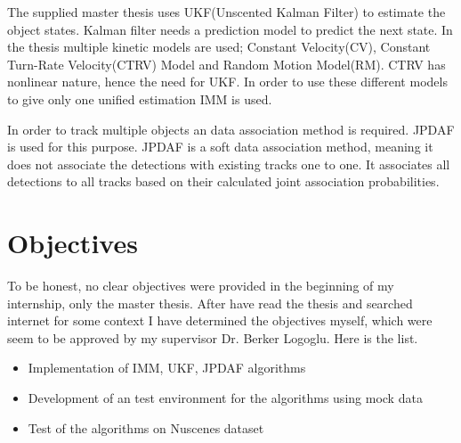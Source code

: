 \documentclass[peerreview]{IEEEtran}
\begin{document}
The supplied master thesis uses UKF(Unscented Kalman Filter) to estimate the object states. Kalman filter needs a prediction model to predict the next state. In the thesis multiple kinetic models are used; Constant Velocity(CV), Constant Turn-Rate Velocity(CTRV) Model and Random Motion Model(RM). CTRV has nonlinear nature, hence the need for UKF. In order to use these different models to give only one unified estimation IMM is used.

In order to track multiple objects an data association method is required. JPDAF is used for this purpose. JPDAF is a soft data association method, meaning it does not associate the detections with existing tracks one to one. It associates all detections to all tracks based on their calculated joint association probabilities.

%
%


\section{Objectives}

To be honest, no clear objectives were provided in the beginning of my internship, only the master thesis. After have read the thesis and searched internet for some context I have determined the objectives myself, which were seem to be approved by my supervisor Dr. Berker Logoglu. Here is the list.
\begin{itemize}
\item Implementation of IMM, UKF, JPDAF algorithms
\item Development of an test environment for the algorithms using mock data
\item Test of the algorithms on Nuscenes dataset
\end{itemize}
\end{document}
